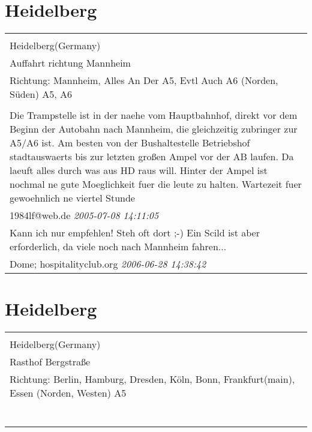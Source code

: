 \documentclass[a4paper,12pt]{article}
\begin{document}
\section{Heidelberg}
\begin{tabular}{|p{13cm}|}
\hline\\
Heidelberg(Germany)\\
Auffahrt richtung Mannheim\\
Richtung: Mannheim, Alles An Der A5, Evtl Auch A6 (Norden, Süden) A5, A6 \\
\hline\\
Die Trampstelle ist in der naehe vom Hauptbahnhof, direkt vor dem Beginn der Autobahn nach Mannheim, die gleichzeitig zubringer zur A5/A6 ist. Am besten von der Bushaltestelle Betriebshof stadtauswaerts bis zur letzten großen Ampel vor der AB laufen. Da laeuft alles durch was aus HD raus will. Hinter der Ampel ist nochmal ne gute Moeglichkeit fuer die leute zu halten. Wartezeit fuer gewoehnlich ne viertel Stunde \\
1984lf@web.de \textit{ 2005-07-08 14:11:05 }\\\hline Kann ich nur empfehlen! Steh oft dort ;-)
Ein Scild ist aber erforderlich, da viele noch nach Mannheim fahren... \\
Dome; hospitalityclub.org \textit{ 2006-06-28 14:38:42 }\\\hline
\end{tabular}


\section{Heidelberg}
\begin{tabular}{|p{13cm}|}
\hline\\
Heidelberg(Germany)\\
Rasthof Bergstraße\\
Richtung: Berlin, Hamburg, Dresden, Köln, Bonn, Frankfurt(main), Essen (Norden, Westen) A5 \\
\hline\\
\\\
\end{tabular}
\end{document}
